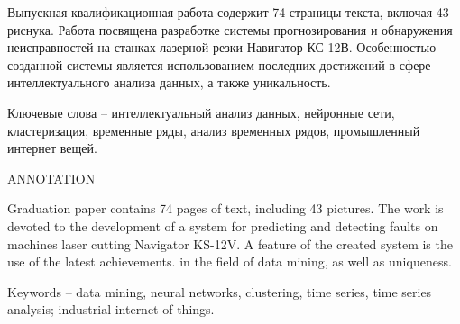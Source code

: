 
Выпускная квалификационная работа содержит 74 страницы текста, включая 43 риснука.
Работа посвящена разработке системы прогнозирования и обнаружения неисправностей на станках
лазерной резки Навигатор КС-12В.
Особенностью созданной системы является использованием последних достижений
в сфере интеллектуального анализа данных,
а также уникальность.

Ключевые слова -- интеллектуальный анализ данных,
нейронные сети, кластеризация, временные ряды,
анализ временных рядов, промышленный интернет вещей.

\begin{center}
    ANNOTATION
\end{center}

Graduation paper contains 74 pages of text, including 43 pictures.
The work is devoted to the development of a system for predicting and detecting faults on machines
laser cutting Navigator KS-12V.
A feature of the created system is the use of the latest achievements.
in the field of data mining,
as well as uniqueness.

Keywords -- data mining,
neural networks, clustering, time series,
time series analysis; industrial internet of things.


\clearpage